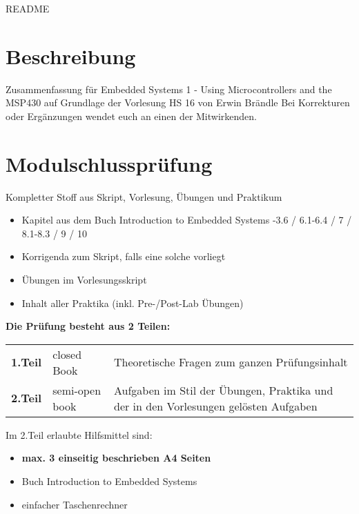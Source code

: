 \thispagestyle{empty}
\setcounter{page}{0} %
\vspace*{-2cm}
{\huge README }
{\scriptsize
\section*{Beschreibung}
Zusammenfassung für Embedded Systems 1 - Using Microcontrollers and the MSP430 auf Grundlage der Vorlesung HS 16 von Erwin Brändle  \newline
Bei Korrekturen oder Ergänzungen wendet euch an einen der Mitwirkenden.


\section*{Modulschlussprüfung}
Kompletter Stoff aus Skript, Vorlesung, Übungen und Praktikum

    \begin{itemize}
        \item Kapitel aus dem Buch Introduction to Embedded Systems 
	        -3.6 / 6.1-6.4 / 7 / 8.1-8.3 / 9 / 10 
	     \item Korrigenda zum Skript, falls eine solche vorliegt  
	     \item Übungen im Vorlesungsskript  
	     \item Inhalt aller Praktika (inkl. Pre-/Post-Lab Übungen)
    \end{itemize}

\textbf{Die Prüfung besteht aus 2 Teilen:}\newline
\begin{tabular}{p{1.5cm} p{3cm} p{10cm}}
    \textbf{ 1.Teil}   & closed Book & Theoretische Fragen zum ganzen Prüfungsinhalt \\ 
    \textbf{ 2.Teil}   & semi-open book & Aufgaben im Stil der Übungen, Praktika und der in den Vorlesungen gelösten Aufgaben \\ 
\end{tabular} \newline

Im 2.Teil erlaubte Hilfsmittel sind:
\begin{itemize}
	\item \textbf{max. 3 einseitig beschrieben A4 Seiten}
	\item Buch Introduction to Embedded Systems
	\item einfacher Taschenrechner
\end{itemize}

}

